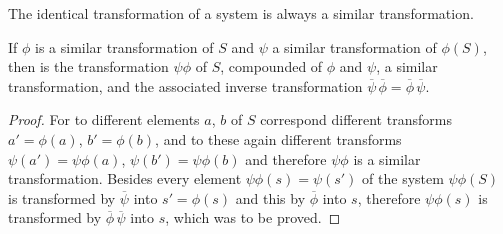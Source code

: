 \begin{theorem}\label{dedekind-30} The identical transformation of a
system is always a similar transformation.

\end{theorem}
\begin{theorem}\label{dedekind-31} If $\phi$ is a similar transformation of
$S$ and $\psi$ a similar transformation of $\phi(S)$, then is the
transformation $\psi\phi$ of $S$, compounded of $\phi$ and $\psi$, a similar
transformation, and the associated inverse transformation
$\overline{\psi}\,\overline{\phi} = \overline{\phi}\,\overline{\psi}$.
\end{theorem}
\begin{proof}For to different elements $a$, $b$ of $S$ correspond
different transforms $a' = \phi(a)$, $b'=\phi(b)$, and
to these again different transforms $\psi(a')=\psi\phi(a)$,
$\psi(b') =\psi\phi(b)$ and therefore $\psi\phi$ is a similar transformation.
Besides every element $\psi\phi(s) = \psi(s')$ of the
system $\psi\phi(S)$ is transformed by $\overline{\psi}$ into $s' = \phi(s)$ and
this by $\overline{\phi}$ into $s$, therefore $\psi\phi(s)$ is transformed by
$\overline{\phi}\,\overline{\psi}$ into $s$, which was to be proved.

\end{proof}
